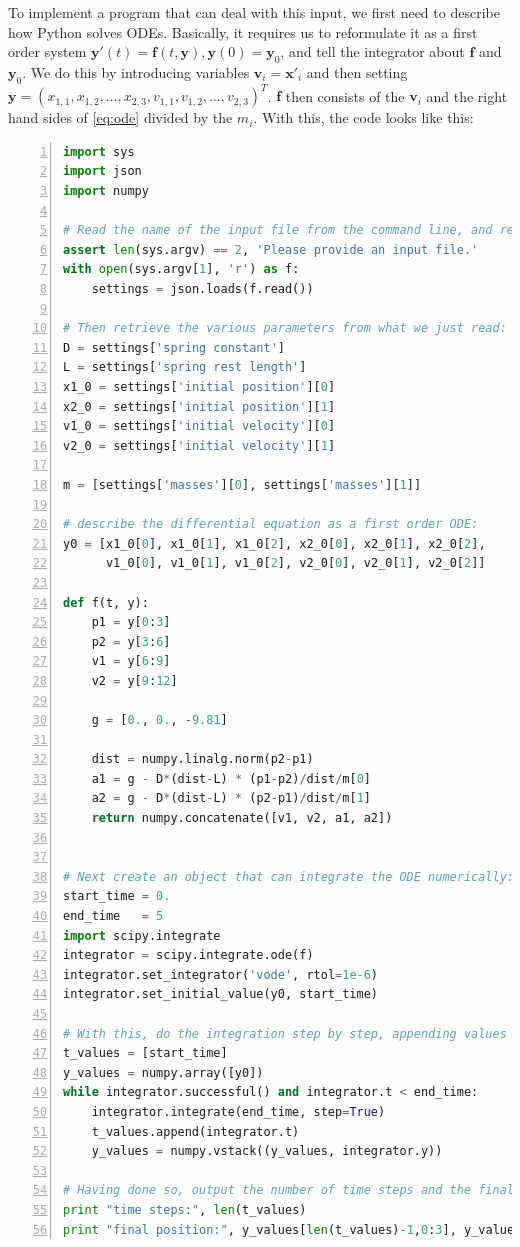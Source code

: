 \documentclass{article}
\begin{document}
To implement a program that can deal with this input, we first need to
describe how Python solves ODEs. Basically, it requires us to reformulate it
as a first order system $\mathbf y'(t)=\mathbf f(t,\mathbf y), \mathbf
y(0)=\mathbf y_0$, and tell the integrator about $\mathbf f$ and $\mathbf
y_0$. We do this by introducing variables $\mathbf v_i=\mathbf x'_i$ and then
setting $\mathbf
y=(x_{1,1},x_{1,2},\ldots,x_{2,3},v_{1,1},v_{1,2},\ldots,v_{2,3})^T$. $\mathbf
f$ then consists of the $\mathbf v_i$ and the right hand sides of
\eqref{eq:ode} divided by the $m_i$. With this, the code looks like this:
\begin{lstlisting}[frame=single,basicstyle=\footnotesize,numbers=left,language=Python]
import sys
import json
import numpy

# Read the name of the input file from the command line, and read options from the file:
assert len(sys.argv) == 2, 'Please provide an input file.'
with open(sys.argv[1], 'r') as f:
    settings = json.loads(f.read())

# Then retrieve the various parameters from what we just read:
D = settings['spring constant']
L = settings['spring rest length']
x1_0 = settings['initial position'][0]
x2_0 = settings['initial position'][1]
v1_0 = settings['initial velocity'][0]
v2_0 = settings['initial velocity'][1]

m = [settings['masses'][0], settings['masses'][1]]

# describe the differential equation as a first order ODE:
y0 = [x1_0[0], x1_0[1], x1_0[2], x2_0[0], x2_0[1], x2_0[2],
      v1_0[0], v1_0[1], v1_0[2], v2_0[0], v2_0[1], v2_0[2]]

def f(t, y):
    p1 = y[0:3]
    p2 = y[3:6]
    v1 = y[6:9]
    v2 = y[9:12]

    g = [0., 0., -9.81]

    dist = numpy.linalg.norm(p2-p1)
    a1 = g - D*(dist-L) * (p1-p2)/dist/m[0]
    a2 = g - D*(dist-L) * (p2-p1)/dist/m[1]
    return numpy.concatenate([v1, v2, a1, a2])


# Next create an object that can integrate the ODE numerically:
start_time = 0.
end_time   = 5
import scipy.integrate
integrator = scipy.integrate.ode(f)
integrator.set_integrator('vode', rtol=1e-6)
integrator.set_initial_value(y0, start_time)

# With this, do the integration step by step, appending values to an array in each step:
t_values = [start_time]
y_values = numpy.array([y0])
while integrator.successful() and integrator.t < end_time:
    integrator.integrate(end_time, step=True)
    t_values.append(integrator.t)
    y_values = numpy.vstack((y_values, integrator.y))

# Having done so, output the number of time steps and the final positions:
print "time steps:", len(t_values)
print "final position:", y_values[len(t_values)-1,0:3], y_values[len(t_values)-1,3:6]
\end{lstlisting}
\end{document}
